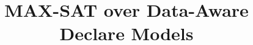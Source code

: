 \documentclass[runningheads]{llncs}
\begin{document}
%
\title{MAX-SAT over Data-Aware Declare Models}
%
%

%

%
%
\maketitle              %
\linespread{0.92}
\vspace{-0.5cm}

\begin{abstract}
\end{abstract}
\end{document}
